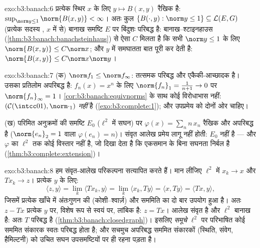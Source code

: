 \begin{solution}{exo:b3:banach:6}
प्रत्येक स्थिर $x$ के लिए $y \mapsto B(x, y)$  रैखिक है: $\sup_{\norm y \leq 1}\norm{B(x,y)} < \infty$। अतः कुल
$\{B(\cdot, y) : \norm y \leq 1\} \subseteq \mathcal L(E, G)$
(प्रत्येक सदस्य , $x$ में  से) बानाख समष्टि $E$ पर
बिंदुशः परिबद्ध है: बानाख--श्टाइनहाउस (\cref{thm:b3:banach:banachsteinhaus}) से ऐसा $C$ मिलता है
कि सभी $\norm y \leq 1$ के लिए $\norm{B(x,y)} \leq C\norm x$; और $y$ में समघातता बात पूरी कर देती
है: $\norm{B(x,y)} \leq
C\norm x\norm y$।
\end{solution}

\begin{solution}{exo:b3:banach:7}
(क) $\norm f_1 \leq \norm f_\infty$: तत्समक परिबद्ध और एकैकी-आच्छादक है। उसका प्रतिलोम अपरिबद्ध
है: $f_n(x) = x^n$ के लिए $\norm{f_n}_1 = \frac1{n+1} \to 0$ पर $\norm{f_n}_\infty = 1$। \cref{cor:b3:banach:equivnorms} के साथ कोई विरोधाभास नहीं:
$(\mathcal
C(\intcc01), \norm\cdot_1)$  \emph{नहीं} है (\cref{exo:b3:complete:1}); और उपप्रमेय को दोनों ओर 
चाहिए।

(ख) परिमित अनुक्रमों की समष्टि $E_0$ ($\ell^2$ में सघन) पर $\varphi(x) = \sum_n n\,x_n$ रैखिक
और अपरिबद्ध है ($\norm{e_n}_2 = 1$ वाला $\varphi(e_n) = n$)। संवृत आलेख प्रमेय लागू नहीं होती:
$E_0$  नहीं है --- और $\varphi$ का $\ell^2$ तक कोई  विस्तार नहीं
है, जो दिखा देता है कि एकसमान  के बिना सघनता निर्बल है (\cref{thm:b3:complete:extension})।
\end{solution}

\begin{solution}{exo:b3:banach:8}
हम संवृत-आलेख परिकल्पना सत्यापित करते हैं। मान लीजिए $\ell^2$ में $x_k \to x$
और $Tx_k \to z$। प्रत्येक $y$ के लिए:
\[
\langle z, y\rangle = \lim_k\langle Tx_k, y\rangle
= \lim_k \langle x_k, Ty\rangle = \langle x, Ty\rangle
= \langle Tx, y\rangle,
\]
जिसमें प्रत्येक खाँचे में अंतःगुणन की  (कोशी--श्वार्ज़) और
सममिति का दो बार उपयोग हुआ है। अतः $z - Tx$ प्रत्येक $y$ पर, विशेष
रूप से स्वयं पर, लांबिक है: $z = Tx$। आलेख संवृत है और $\ell^2$ बानाख है:
अतः $T$ परिबद्ध है (\cref{thm:b3:banach:closedgraph})। इसलिए \emph{समूचे} $\ell^2$ पर परिभाषित
कोई सममित संकारक स्वतः परिबद्ध होता है; और सचमुच अपरिबद्ध सममित
संकारकों (स्थिति, संवेग, हैमिल्टनी) को उचित सघन उपसमष्टियों पर ही
रहना पड़ता है।
\end{solution}


